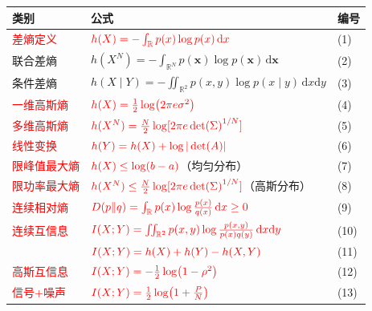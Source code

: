{\scriptsize
\begin{tabularx}{\textwidth}{@{}l>{\raggedright\arraybackslash}X>{\raggedleft\arraybackslash}p{1.8em}@{}}
\toprule
\textbf{类别} & \textbf{公式} & \textbf{编号} \\
\midrule
\textcolor{Red}{差熵定义} & $\textcolor{Red}{h(X)=-\int_{\mathbb{R}} p(x)\log p(x)\,\mathrm{d}x}$ & (1) \\
联合差熵 & $h(X^N)=-\int_{\mathbb{R}^N} p(\bm{x})\log p(\bm{x})\,\mathrm{d}\bm{x}$ & (2) \\
条件差熵 & $h(X\mid Y)=-\iint_{\mathbb{R}^2} p(x,y)\log p(x\mid y)\,\mathrm{d}x\mathrm{d}y$ & (3) \\
\midrule
\textcolor{Red}{一维高斯熵} & $\textcolor{Red}{h(X)=\frac12\log(2\pi e\sigma^2)}$ & (4) \\
\textcolor{Red}{多维高斯熵} & $\textcolor{Red}{h(X^N)=\frac{N}{2}\log[2\pi e\det(\Sigma)^{1/N}]}$ & (5) \\
\midrule
\textcolor{Red}{线性变换} & $\textcolor{Red}{h(Y)=h(X)+\log|\det(A)|}$ & (6) \\
\midrule
\textcolor{Red}{限峰值最大熵} & $\textcolor{Red}{h(X)\le\log(b-a)}$（均匀分布） & (7) \\
\textcolor{Red}{限功率最大熵} & $\textcolor{Red}{h(X^N)\le\frac{N}{2}\log[2\pi e\det(\Sigma)^{1/N}]}$（高斯分布） & (8) \\
\midrule
\textcolor{Red}{连续相对熵} & $\textcolor{Red}{D(p\|q)=\int_{\mathbb{R}} p(x)\log\frac{p(x)}{q(x)}\,\mathrm{d}x\ge 0}$ & (9) \\
\midrule
\textcolor{Red}{连续互信息} & $\textcolor{Red}{I(X;Y)=\iint_{\mathbb{R}^2} p(x,y)\log\frac{p(x,y)}{p(x)q(y)}\,\mathrm{d}x\mathrm{d}y}$ & (10) \\
 & $\textcolor{Red}{I(X;Y)=h(X)+h(Y)-h(X,Y)}$ & (11) \\
\textcolor{Red}{高斯互信息} & $\textcolor{Red}{I(X;Y)=-\frac12\log(1-\rho^2)}$ & (12) \\
\textcolor{Red}{信号+噪声} & $\textcolor{Red}{I(X;Y)=\frac12\log\bigl(1+\frac{P}{N}\bigr)}$ & (13) \\
\bottomrule
\end{tabularx}
}

